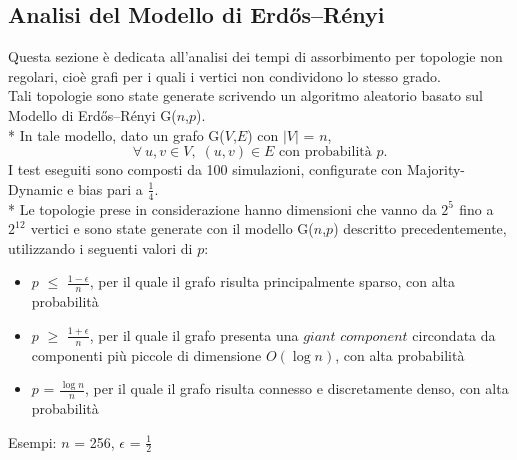 \documentclass{article}
\begin{document}
\subsection{Analisi del Modello di Erdős–Rényi}
Questa sezione è dedicata all'analisi dei tempi di assorbimento per topologie non regolari, cioè grafi per i quali i vertici non condividono lo stesso grado.\\
Tali topologie sono state generate scrivendo un algoritmo aleatorio basato sul Modello di Erdős–Rényi G($n$,$p$).\\*
In tale modello, dato un grafo G($V$,$E$) con $|V|$ = $n$,
\begin{equation}
    \forall \: u,v \in V,\; (u,v) \in E  \text{ con probabilità } p.
\end{equation}
I test eseguiti sono composti da 100 simulazioni, configurate con Majority-Dynamic e bias pari a $\frac{1}{4}$.\\*
Le topologie prese in considerazione hanno dimensioni che vanno da $2^{5^{\mathrm{}}}$ fino a $2^{12^{\mathrm{}}}$ vertici e sono state generate con il modello G($n$,$p$) descritto precedentemente, utilizzando i seguenti valori di $p$:
\begin{itemize}
\item $p$ $\leq$ $\frac{1-\epsilon}{n}$, per il quale il grafo risulta principalmente sparso, con alta probabilità
\item $p$ $\geq$ $\frac{1+\epsilon}{n}$, per il quale il grafo presenta una $giant$ $component$ circondata da componenti più piccole di dimensione $O(\log{}n)$, con alta probabilità
\item $p$ = $\frac{\log{}n}{n}$, per il quale il grafo risulta connesso e discretamente denso, con alta probabilità
\end{itemize}
Esempi: $n$ = 256, $\epsilon$ = $\frac{1}{2}$
\end{document}
